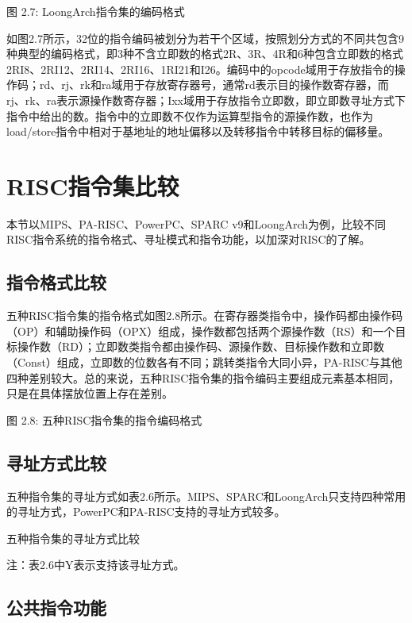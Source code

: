 \documentclass[]{ctexbook}
\begin{document}
图 2.7: LoongArch指令集的编码格式

如图2.7所示，32位的指令编码被划分为若干个区域，按照划分方式的不同共包含9种典型的编码格式，即3种不含立即数的格式2R、3R、4R和6种包含立即数的格式2RI8、2RI12、2RI14、2RI16、1RI21和I26。编码中的opcode域用于存放指令的操作码；rd、rj、rk和ra域用于存放寄存器号，通常rd表示目的操作数寄存器，而rj、rk、ra表示源操作数寄存器；Ixx域用于存放指令立即数，即立即数寻址方式下指令中给出的数。指令中的立即数不仅作为运算型指令的源操作数，也作为load/store指令中相对于基地址的地址偏移以及转移指令中转移目标的偏移量。

\hypertarget{riscux6307ux4ee4ux96c6ux6bd4ux8f83}{%
\section{RISC指令集比较}\label{riscux6307ux4ee4ux96c6ux6bd4ux8f83}}

本节以MIPS、PA-RISC、PowerPC、SPARC v9和LoongArch为例，比较不同RISC指令系统的指令格式、寻址模式和指令功能，以加深对RISC的了解。

\hypertarget{ux6307ux4ee4ux683cux5f0fux6bd4ux8f83}{%
\subsection{指令格式比较}\label{ux6307ux4ee4ux683cux5f0fux6bd4ux8f83}}

五种RISC指令集的指令格式如图2.8所示。在寄存器类指令中，操作码都由操作码（OP）和辅助操作码（OPX）组成，操作数都包括两个源操作数（RS）和一个目标操作数（RD）；立即数类指令都由操作码、源操作数、目标操作数和立即数（Const）组成，立即数的位数各有不同；跳转类指令大同小异，PA-RISC与其他四种差别较大。总的来说，五种RISC指令集的指令编码主要组成元素基本相同，只是在具体摆放位置上存在差别。

图 2.8: 五种RISC指令集的指令编码格式

\hypertarget{ux5bfbux5740ux65b9ux5f0fux6bd4ux8f83}{%
\subsection{寻址方式比较}\label{ux5bfbux5740ux65b9ux5f0fux6bd4ux8f83}}

五种指令集的寻址方式如表2.6所示。MIPS、SPARC和LoongArch只支持四种常用的寻址方式，PowerPC和PA-RISC支持的寻址方式较多。

\label{tab:addr-compare}五种指令集的寻址方式比较

注：表2.6中Y表示支持该寻址方式。

\hypertarget{ux516cux5171ux6307ux4ee4ux529fux80fd}{%
\subsection{公共指令功能}\label{ux516cux5171ux6307ux4ee4ux529fux80fd}}
\end{document}
